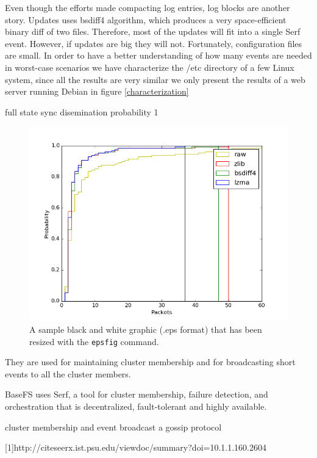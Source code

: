 \documentclass{sig-alternate}
\begin{document}
Even though the efforts made compacting log entries, log blocks are another story. Updates uses bsdiff4 algorithm, which produces a very space-efficient binary diff of two files. Therefore, most of the updates will fit into a single Serf event. However, if updates are big they will not. Fortunately, configuration files are small. In order to have a better understanding of how many events are needed in worst-case scenarios we have characterize the /etc directory of a few Linux system, since all the results are very similar we only present the results of a web server running Debian in figure \ref{characterization}

full state sync disemination probability 1

\begin{figure}
\centering
\includegraphics[width=\columnwidth]{characterization.png}
\caption{A sample black and white graphic (.eps format)
that has been resized with the \texttt{epsfig} command.}
\end{figure}





They are used for maintaining cluster membership and for broadcasting short events to all the cluster members.

BaseFS uses Serf, a tool for cluster membership, failure detection, and orchestration that is decentralized, fault-tolerant and highly available.


cluster membership and event broadcast a gossip protocol

[1]http://citeseerx.ist.psu.edu/viewdoc/summary?doi=10.1.1.160.2604
\end{document}
